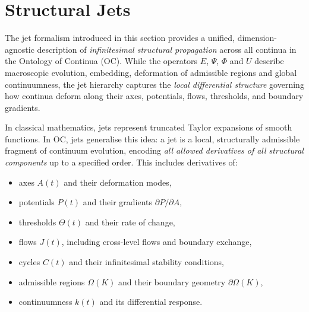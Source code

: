 
\section{Structural Jets}
\label{sec:jets-master}

The jet formalism introduced in this section provides a unified,
dimension-agnostic description of \emph{infinitesimal structural
propagation} across all continua in the Ontology of Continua (OC).
While the operators $E$, $\Psi$, $\Phi$ and $U$ describe macroscopic
evolution, embedding, deformation of admissible regions and global
continuumness, the jet hierarchy captures the \emph{local differential
structure} governing how continua deform along their axes, potentials,
flows, thresholds, and boundary gradients.

\medskip

In classical mathematics, jets represent truncated Taylor expansions of
smooth functions. In OC, jets generalise this idea: a jet is a local,
structurally admissible fragment of continuum evolution, encoding
\emph{all allowed derivatives of all structural components} up to a
specified order. This includes derivatives of:

\begin{itemize}
    \item axes $A(t)$ and their deformation modes,
    \item potentials $P(t)$ and their gradients $\partial P / \partial A$,
    \item thresholds $\Theta(t)$ and their rate of change,
    \item flows $J(t)$, including cross-level flows and boundary exchange,
    \item cycles $C(t)$ and their infinitesimal stability conditions,
    \item admissible regions $\Omega(K)$ and their boundary geometry $\partial\Omega(K)$,
    \item continuumness $k(t)$ and its differential response.
\end{itemize}

